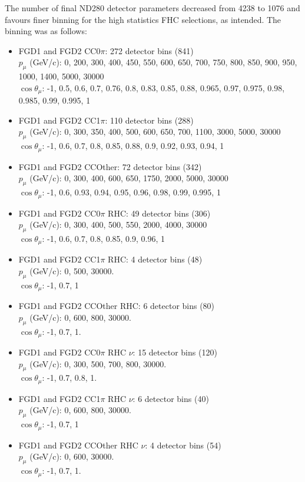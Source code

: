 The number of final ND280 detector parameters decreased from 4238 to 1076 and favours finer binning for the high statistics FHC selections, as intended. The binning was as follows:
\begin{itemize}
	\item FGD1 and FGD2 CC0$\pi$: 272 detector bins (841) \\
	$p_\mu$ (GeV/c): 0, 200, 300, 400, 450, 550, 600, 650, 700, 750, 800, 850, 900, 950, 1000, 1400, 5000, 30000\\
	$\cos\theta_\mu$: -1, 0.5, 0.6, 0.7, 0.76, 0.8, 0.83, 0.85, 0.88, 0.965, 0.97, 0.975, 0.98, 0.985, 0.99, 0.995, 1
	
	\item FGD1 and FGD2 CC1$\pi$: 110 detector bins (288) \\
	$p_\mu$ (GeV/c): 0, 300, 350, 400, 500, 600, 650, 700, 1100, 3000, 5000, 30000\\
	$\cos\theta_\mu$: -1, 0.6, 0.7, 0.8, 0.85, 0.88, 0.9, 0.92, 0.93, 0.94, 1
	
	\item FGD1 and FGD2 CCOther: 72 detector bins (342) \\
	$p_\mu$ (GeV/c): 0, 300, 400, 600, 650, 1750, 2000, 5000, 30000\\
	$\cos\theta_\mu$: -1, 0.6, 0.93, 0.94, 0.95, 0.96, 0.98, 0.99, 0.995, 1
	
	\item FGD1 and FGD2 CC0$\pi$ RHC: 49 detector bins (306) \\
	$p_\mu$ (GeV/c): 0, 300, 400, 500, 550, 2000, 4000, 30000\\
	$\cos\theta_\mu$: -1, 0.6, 0.7, 0.8, 0.85, 0.9, 0.96, 1 
	
	\item FGD1 and FGD2 CC1$\pi$ RHC: 4 detector bins (48) \\
	$p_\mu$ (GeV/c): 0, 500, 30000.\\
	$\cos\theta_\mu$: -1, 0.7, 1
	
	\item FGD1 and FGD2 CCOther RHC: 6 detector bins (80) \\
	$p_\mu$ (GeV/c): 0, 600, 800, 30000.\\
	$\cos\theta_\mu$: -1, 0.7, 1.
	
	\item FGD1 and FGD2 CC0$\pi$ RHC $\nu$: 15 detector bins (120) \\
	$p_\mu$ (GeV/c): 0, 300, 500, 700, 800, 30000.\\
	$\cos\theta_\mu$: -1, 0.7, 0.8, 1.
	
	\item FGD1 and FGD2 CC1$\pi$ RHC $\nu$: 6 detector bins (40) \\
	$p_\mu$ (GeV/c): 0, 600, 800, 30000.\\
	$\cos\theta_\mu$: -1, 0.7, 1
	
	\item FGD1 and FGD2 CCOther RHC $\nu$: 4 detector bins (54)\\
	$p_\mu$ (GeV/c): 0, 600, 30000.\\
	$\cos\theta_\mu$: -1, 0.7, 1.
\end{itemize}

